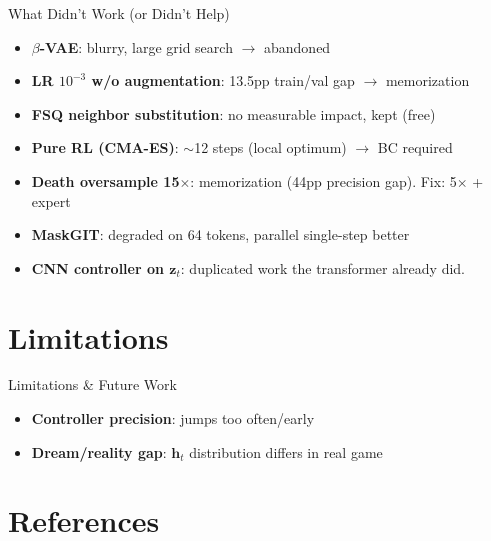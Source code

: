 \documentclass[aspectratio=169]{beamer}
\begin{document}
\begin{frame}{What Didn't Work (or Didn't Help)}
  \vspace{0.5em}
  \begin{itemize}
    \item \textbf{$\beta$-VAE}: blurry, large grid search $\to$ abandoned
    \item \textbf{LR $10^{-3}$ w/o augmentation}: 13.5pp train/val gap $\to$ memorization
    \item \textbf{FSQ neighbor substitution}: no measurable impact, kept (free)
    \item \textbf{Pure RL (CMA-ES)}: $\sim$12 steps (local optimum) $\to$ BC required
    \item \textbf{Death oversample 15$\times$}: memorization (44pp precision gap). Fix: 5$\times$ + expert
    \item \textbf{MaskGIT}: degraded on 64 tokens, parallel single-step better
    \item \textbf{CNN controller on $\mathbf{z}_t$}: duplicated work the transformer already did.
  \end{itemize}
\end{frame}

\section{Limitations}

\begin{frame}{Limitations \& Future Work}
  \begin{itemize}
    \item \textbf{Controller precision}: jumps too often/early
    \item \textbf{Dream/reality gap}: $\mathbf{h}_t$ distribution differs in real game
  \end{itemize}
\end{frame}

\section{References}
\end{document}
